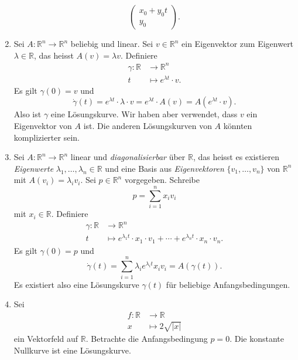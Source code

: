 \documentclass[../main.tex]{subfiles}
\begin{document}
\begin{examples}
\begin{enumerate}[(1)]
\[\begin{pmatrix}
          x_0 + y_0 t \\
          y_0
        \end{pmatrix}.
      \]
    \item Sei $A \colon \mathbb{R}^n \to \mathbb{R}^n$ 
      beliebig und linear.
      Sei $v \in \mathbb{R}^n$ ein Eigenvektor zum Eigenwert
      $\lambda \in \mathbb{R}$, das heisst
      $A(v) = \lambda v$.
      Definiere
       \begin{align*}
        \gamma \colon \mathbb{R} & \to \mathbb{R}^n \\
        t & \mapsto e^{\lambda t} \cdot v.
      \end{align*}
      Es gilt $\gamma(0) = v$ und
      \[
        \dot \gamma(t) = e^{\lambda t} \cdot \lambda \cdot v
        = e^{\lambda t}  \cdot A(v)
        = A(e^{\lambda t} \cdot v).
      \]
      Also ist $\gamma$ eine Lösungskurve.
      Wir haben aber verwendet, dass $v$ ein Eigenvektor
      von $A$ ist. Die anderen Lösungskurven von $A$ 
      könnten komplizierter sein.
    \item Sei $A \colon \mathbb{R}^n \to \mathbb{R}^n$ 
      linear und \emph{diagonalisierbar} über $\mathbb{R}$,
      das heisst es existieren
      \emph{Eigenwerte} $\lambda_1, \dots, \lambda_n \in \mathbb{R}$ 
      und eine Basis aus \emph{Eigenvektoren}
      $\{v_1, \dots, v_n\}$ von $\mathbb{R}^n$ 
      mit $A(v_i) = \lambda_i v_i$.
      Sei $p \in \mathbb{R}^n$ vorgegeben. Schreibe
      \[
        p = \sum_{i=1}^{n} x_i v_i
      \]
      mit $x_i \in \mathbb{R}$.
      Definiere
      \begin{align*}
        \gamma \colon \mathbb{R} & \to \mathbb{R}^n \\
        t & \mapsto e^{\lambda_1 t} \cdot x_1 \cdot v_1 +
        \cdots
        +
        e^{\lambda_n t} \cdot x_n \cdot v_n.
      \end{align*}
      Es gilt $\gamma(0) = p$ und
      \[
        \dot \gamma(t) = \sum_{i=1}^{n} \lambda_i e^{\lambda_i t}x_i v_i
        = A(\gamma(t)).
      \]
      Es existiert also eine Lösungskurve $\gamma(t)$ 
      für beliebige Anfangsbedingungen.
    \item Sei
      \begin{align*}
        f \colon \mathbb{R} & \to \mathbb{R} \\
        x & \mapsto 2 \sqrt{|x|}
      \end{align*}
      ein Vektorfeld auf $\mathbb{R}$.
      Betrachte die Anfangsbedingung $p = 0$.
      Die konstante Nullkurve ist
      eine Lösungskurve.

\end{enumerate}
\end{examples}
\end{document}
